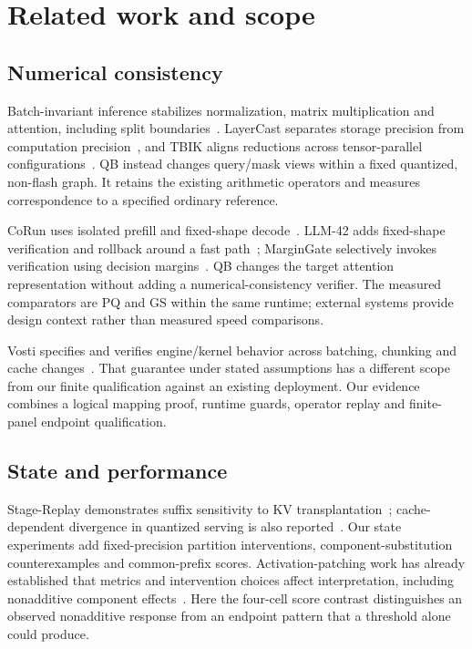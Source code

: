 \section{Related work and scope}
\label{sec:related}
\subsection{Numerical consistency}
Batch-invariant inference stabilizes normalization, matrix multiplication and attention, including split boundaries~\cite{thinkingmachines}. LayerCast separates storage precision from computation precision~\cite{layercast}, and TBIK aligns reductions across tensor-parallel configurations~\cite{tbik}. QB instead changes query/mask views within a fixed quantized, non-flash graph. It retains the existing arithmetic operators and measures correspondence to a specified ordinary reference.

CoRun uses isolated prefill and fixed-shape decode~\cite{corun}. LLM-42 adds fixed-shape verification and rollback around a fast path~\cite{llm42}; MarginGate selectively invokes verification using decision margins~\cite{margingate}. QB changes the target attention representation without adding a numerical-consistency verifier. The measured comparators are PQ and GS within the same runtime; external systems provide design context rather than measured speed comparisons.

Vosti specifies and verifies engine/kernel behavior across batching, chunking and cache changes~\cite{vosti}. That guarantee under stated assumptions has a different scope from our finite qualification against an existing deployment. Our evidence combines a logical mapping proof, runtime guards, operator replay and finite-panel endpoint qualification.

\subsection{State and performance}
Stage-Replay demonstrates suffix sensitivity to KV transplantation~\cite{stagereplay}; cache-dependent divergence in quantized serving is also reported~\cite{cachestate}. Our state experiments add fixed-precision partition interventions, component-substitution counterexamples and common-prefix scores. Activation-patching work has already established that metrics and intervention choices affect interpretation, including nonadditive component effects~\cite{patching,mediators}. Here the four-cell score contrast distinguishes an observed nonadditive response from an endpoint pattern that a threshold alone could produce.

